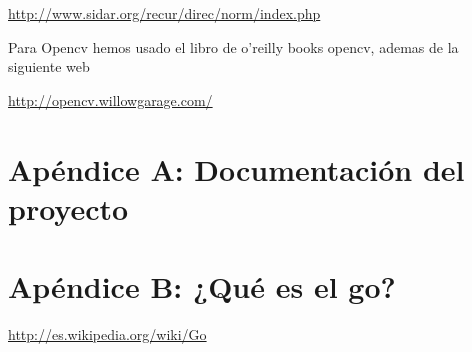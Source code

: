 \documentclass[12pt,a4paper]{report}
\begin{document}
\url{http://www.sidar.org/recur/direc/norm/index.php}

Para Opencv hemos usado el libro de o'reilly books opencv, ademas de la siguiente web

\url{http://opencv.willowgarage.com/}

\chapter{Apéndice A: Documentación del proyecto} 


















\chapter{Apéndice B: ¿Qué es el go?} 
\url{http://es.wikipedia.org/wiki/Go}
\end{document}
